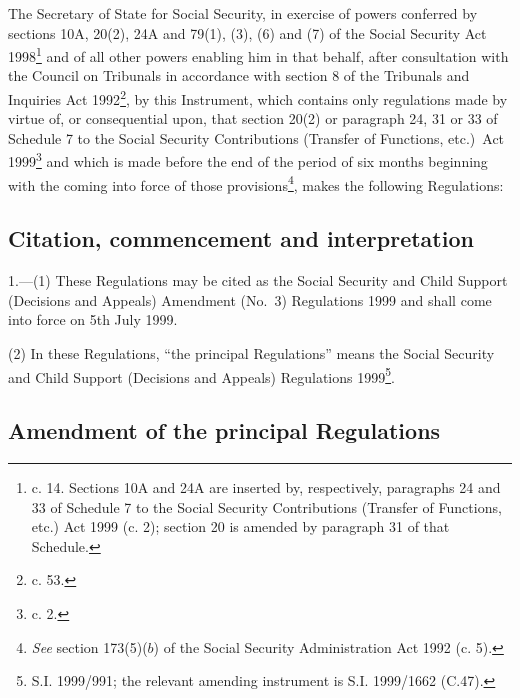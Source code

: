 \documentclass[12pt,a4paper]{article}
\title{\regstitle}
\author{S.I. 1999 No. 1623}
\date{Made
14th June 1999\\
Laid before Parliament
14th June 1999\\
Coming into force
5th July 1999}
\begin{document}
\maketitle

\noindent
The Secretary of State for Social Security, in exercise of powers conferred by sections 10A, 20(2), 24A and 79(1), (3), (6) and (7) of the Social Security Act 1998\footnote{ c. 14. Sections 10A and 24A are inserted by, respectively, paragraphs 24 and 33 of Schedule 7 to the Social Security Contributions (Transfer of Functions, etc.) Act 1999 (c. 2); section 20 is amended by paragraph 31 of that Schedule.} and of all other powers enabling him in that behalf, after consultation with the Council on Tribunals in accordance with section 8 of the Tribunals and Inquiries Act 1992\footnote{ c. 53.}, by this Instrument, which contains only regulations made by virtue of, or consequential upon, that section 20(2) or paragraph 24, 31 or 33 of Schedule 7 to the Social Security Contributions (Transfer of Functions, etc.)\ Act 1999\footnote{ c. 2.} and which is made before the end of the period of six months beginning with the coming into force of those provisions\footnote{\frenchspacing \emph{See} section 173(5)($b$) of the Social Security Administration Act 1992 (c. 5).}, makes the following Regulations: 

{\sloppy

\tableofcontents

}

\bigskip

\setcounter{secnumdepth}{-2}

\subsection[1. Citation, commencement and interpretation]{Citation, commencement and interpretation}

1.---(1)  These Regulations may be cited as the Social Security and Child Support (Decisions and Appeals) Amendment (No.\ 3) Regulations 1999 and shall come into force on 5th July 1999.

(2) In these Regulations, “the principal Regulations” means the Social Security and Child Support (Decisions and Appeals) Regulations 1999\footnote{\frenchspacing S.I. 1999/991; the relevant amending instrument is S.I. 1999/1662 (C.47).}.

\subsection[2. Amendment of the principal Regulations]{Amendment of the principal Regulations}
\end{document}
